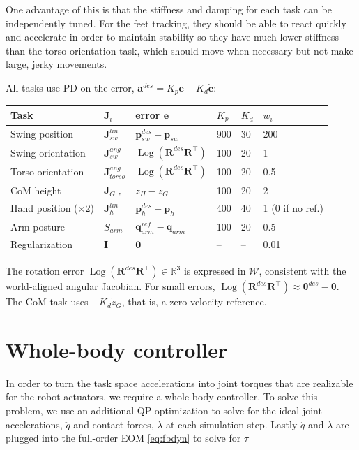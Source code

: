 \documentclass[11pt]{article}
\theoremstyle{remark}
\theoremstyle{definition}
\newcommand{\R}{\mathbb{R}}
\newcommand{\q}{\bm{q}}
\newcommand{\p}{\bm{p}}
\newcommand{\J}{\bm{J}}
\newcommand{\Rot}{\bm{R}}
\newcommand{\I}{\bm{I}}
\newcommand{\zero}{\bm{0}}
\DeclareMathOperator{\Log}{Log}
\begin{document}
One advantage of this is that the stiffness and damping for each task can be independently tuned. For the feet tracking, 
they should be able to react quickly and accelerate in order to maintain stability so they have much lower stiffness than the torso orientation task, which should move when necessary but not make large, jerky movements.   

All tasks use PD on the error, $\bm a^{des}=K_p\bm e+K_d\dot{\bm e}$:
\begin{center}
\begin{tabular}{llllll}
\toprule
Task & $\J_i$ & error $\bm e$ & $K_p$ & $K_d$ & $w_i$\\
\midrule
Swing position & $\J_{sw}^{lin}$ & $\p_{sw}^{des}-\p_{sw}$ & 900 & 30 & 200\\
Swing orientation & $\J_{sw}^{ang}$ & $\Log(\Rot^{des}\Rot^\top)$ & 100 & 20 & 1\\
Torso orientation & $\J_{torso}^{ang}$ & $\Log(\Rot^{des}\Rot^\top)$ & 100 & 20 & 0.5\\
CoM height & $\J_{G,z}$ & $z_H-z_G$ & 100 & 20 & 2\\
Hand position ($\times2$) & $\J_h^{lin}$ & $\p_h^{des}-\p_h$ & 400 & 40 & 1 (0 if no ref.)\\
Arm posture & $S_{arm}$ & $\q_{arm}^{ref}-\q_{arm}$ & 100 & 20 & 0.5\\
Regularization & $\I$ & $\zero$ & -- & -- & 0.01\\
\bottomrule
\end{tabular}
\end{center}
The rotation error $\Log(\Rot^{des}\Rot^\top)\in\R^3$ is expressed in $\mathcal W$, consistent with the world-aligned
angular Jacobian. For small errors, $\Log(\Rot^{des}\Rot^\top)\approx\bm\theta^{des}-\bm\theta$. The CoM task
uses $-K_d\dot z_G$, that is, a zero velocity reference.

\section{Whole-body controller}\label{sec:wbc}
In order to turn the task space accelerations into joint torques that are realizable for the robot actuators, we require a whole body controller.
To solve this problem, we use an additional QP optimization to solve for the ideal joint accelerations, $\ddot{q}$ and contact forces, $\lambda$ at each simulation step. 
Lastly $\ddot{q}$ and $\lambda$ are plugged into the full-order EOM \ref{eq:fbdyn} to solve for $\tau$
\end{document}
